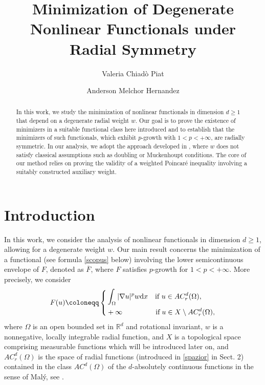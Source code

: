 \documentclass[11pt,leqno]{amsart}
\title{Minimization of Degenerate Nonlinear Functionals under Radial Symmetry}
\author[V.~Chiad\`o Piat]{Valeria Chiad\`o Piat}
\author[A.~Melchor Hernandez]{Anderson Melchor Hernandez}
\theoremstyle{remark}
\theoremstyle{definition}
\theoremstyle{definition}
\def\de{{\rm d}}
\begin{document}
\begin{abstract}
In this work, we study the minimization of nonlinear functionals in dimension $d\geq 1$ that depend on a degenerate radial weight $w$. Our goal is to prove the existence of minimizers in a suitable functional class here introduced and to establish that the minimizers of such functionals, which exhibit $p$-growth with $1 < p < +\infty$, are radially symmetric. In our analysis, we adopt the approach developed in \cite{CCMH1,CC}, where $w$  does not satisfy classical assumptions such as doubling or Muckenhoupt conditions.  The core of our method relies on proving the validity of a weighted Poincaré inequality involving a suitably constructed auxiliary weight.
\end{abstract}
\maketitle
\tableofcontents
\section{Introduction}
In this work, we consider the analysis of nonlinear functionals in dimension $d\geq 1$, allowing for a degenerate weight $w$.  Our main result concerns the minimization of a functional (see formula \eqref{scopus} below) involving the lower semicontinuous envelope of $F$, denoted as $\overline{F}$,  where $F$ satisfies $p$-growth for $1<p<+\infty$. More precisely, we consider
\begin{align*}
F(u)\coloneqq\left\{
\begin{aligned}
& \int_{\Omega} |\nabla u|^{p}w \de x\text{ \ \ if } u\in AC_{r}^{d}(\Omega),\\
& +\infty \ \ \ \ \ \ \ \ \ \ \ \ \ \ \text{if}\hskip 0,1cm  u\in X\setminus AC_{r}^{d}(\Omega),
\end{aligned}
\right.
\end{align*}
where $\Omega$ is an open bounded set in $\mathbb{R}^{d}$ and rotational invariant,  $w$ is a nonnegative, locally integrable radial function, and $X$ is a topological space comprising measurable functions which will be introduced later on, and $AC_{r}^{d}(\Omega)$ is the space of radial functions (introduced in \eqref{spazior} in Sect. 2) contained in the class $AC^{d}(\Omega)$ of the $d$-absolutely continuous functions in the sense of Mal{\'y}, see \cite[Page 2]{Mal}. 
\end{document}
